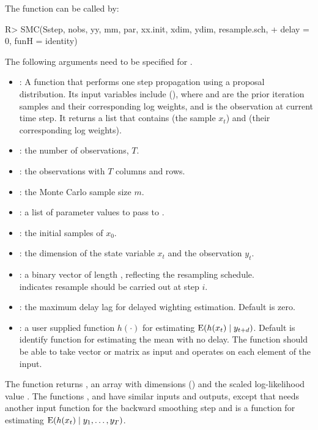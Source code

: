The  function can be called by:
\begin{example}
R> SMC(Sstep, nobs, yy, mm, par, xx.init, xdim, ydim, resample.sch,
+    delay = 0, funH = identity)
\end{example}
The following arguments need to be specified for .
\begin{itemize}\setlength\itemsep{-0.3em}
\item {}: A function that performs one step propagation using a proposal distribution. Its input variables include (), where   and  are the prior iteration samples and their corresponding log weights, and  is the observation at current time step. It returns a list that contains  (the sample $x_t$) and  (their corresponding log weights).
\item {}: the number of observations, $T$.
\item {}: the observations with $T$ columns and  rows.
\item {}: the Monte Carlo sample size $m$.
\item {}: a list of parameter values to pass to .
\item {}: the initial samples of $x_0$.
\item {}: the dimension of the state variable $x_t$ and the observation $y_t$.
\item {}: a binary vector of length , reflecting the resampling schedule. \\
 indicates resample should be carried out at step $i$.
\item {}: the maximum delay lag for delayed wighting estimation. Default is zero.
\item {}: a user supplied function $h(\cdot)$ for estimating ${\rm E}(h(x_t)\mid y_{t+d})$. Default is identify function for estimating the mean with no delay. The function should be able to take vector or matrix as input and operates on each element of the input.
\end{itemize}
The function returns , an array with dimensions () and the scaled log-likelihood value . The functions ,  and  have similar inputs and outputs, except that  needs another input function for the backward smoothing step and  is a function for estimating ${\rm E}(h(x_t)\mid y_1,\ldots, y_{T})$.

